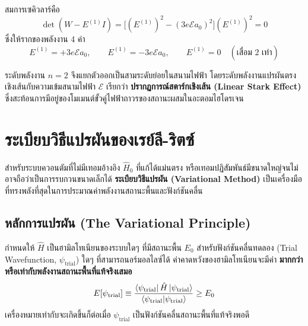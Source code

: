 สมการเซคิวลาร์คือ
\begin{equation}
\det(W - E^{(1)} I) = \big[ (E^{(1)})^2 - (3e\mathcal{E}a_0)^2 \big] (E^{(1)})^2 = 0
\end{equation}
ซึ่งให้รากของพลังงาน 4 ค่า
\begin{equation}
E^{(1)} = +3e\mathcal{E}a_0, \qquad E^{(1)} = -3e\mathcal{E}a_0, \qquad E^{(1)} = 0 \quad (\text{เสื่อม 2 เท่า})
\end{equation}

ระดับพลังงาน $n = 2$ จึงแยกตัวออกเป็นสามระดับย่อยในสนามไฟฟ้า โดยระดับพลังงานแปรผันตรงเชิงเส้นกับความเข้มสนามไฟฟ้า $\mathcal{E}$ เรียกว่า \textbf{ปรากฏการณ์สตาร์กเชิงเส้น (Linear Stark Effect)} ซึ่งสะท้อนการมีอยู่ของโมเมนต์ขั้วคู่ไฟฟ้าถาวรของสถานะผสมในอะตอมไฮโดรเจน

\section{ระเบียบวิธีแปรผันของเรย์ลี-ริตซ์}

สำหรับระบบควอนตัมที่ไม่มีเทอมอ้างอิง $\hat{H}_0$ ที่แก้ได้แม่นตรง หรือเทอมปฏิสัมพันธ์มีขนาดใหญ่จนไม่อาจถือว่าเป็นการรบกวนขนาดเล็กได้ \textbf{ระเบียบวิธีแปรผัน (Variational Method)} เป็นเครื่องมือที่ทรงพลังที่สุดในการประมาณค่าพลังงานสถานะพื้นและฟังก์ชันคลื่น

\subsection{หลักการแปรผัน (The Variational Principle)}
กำหนดให้ $\hat{H}$ เป็นฮามิลโทเนียนของระบบใดๆ ที่มีสถานะพื้น $E_0$ สำหรับฟังก์ชันคลื่นทดลอง (Trial Wavefunction, $\psi_{\text{trial}}$) ใดๆ ที่สามารถนอร์มอลไลซ์ได้ ค่าคาดหวังของฮามิลโทเนียนจะมีค่า \textbf{มากกว่าหรือเท่ากับพลังงานสถานะพื้นที่แท้จริงเสมอ}
\begin{equation}
E[\psi_{\text{trial}}] \equiv \frac{\bra{\psi_{\text{trial}}} \hat{H} \ket{\psi_{\text{trial}}}}{\braket{\psi_{\text{trial}}}{\psi_{\text{trial}}}} \ge E_0
\label{eq:variational_principle}
\end{equation}
เครื่องหมายเท่ากับจะเกิดขึ้นก็ต่อเมื่อ $\psi_{\text{trial}}$ เป็นฟังก์ชันคลื่นสถานะพื้นที่แท้จริงพอดี

